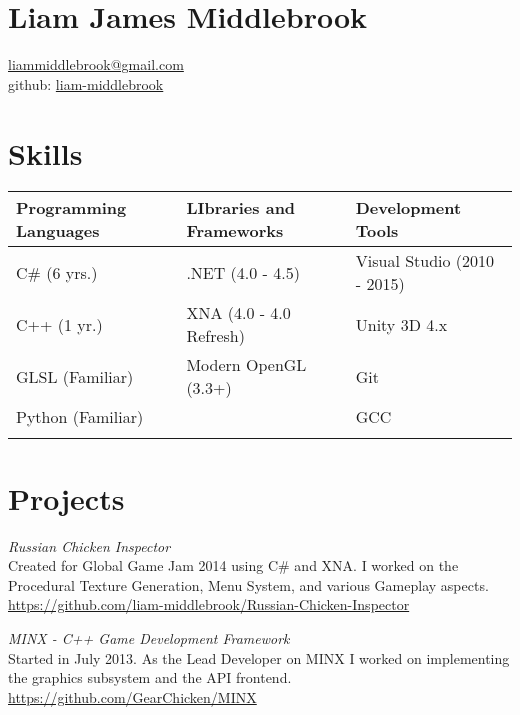 \documentclass[line,margin]{res}
\begin{document}
\marginsize{.25in}{.25in}{.25in}{.25in}

\section{Liam James Middlebrook}

\href{mailto:liammiddlebrook@gmail.com}{liammiddlebrook@gmail.com}\\
github: \href{https://github.com/liam-middlebrook}{liam-middlebrook}

\begin{resume}
\section{Skills}
\begin{table}[h]
\begin{tabular}{@{}lll@{}}
\toprule
Programming Languages & LIbraries and Frameworks & Development Tools           \\ \midrule
C\# (6 yrs.)          & .NET (4.0 - 4.5)         & Visual Studio (2010 - 2015) \\
C++ (1 yr.)           & XNA (4.0 - 4.0 Refresh)  & Unity 3D 4.x                \\
GLSL (Familiar)       & Modern OpenGL (3.3+)     & Git                         \\
Python (Familiar)     &                          & GCC                         \\
                      &                          &                             \\ \bottomrule
\end{tabular}
\end{table}
\section{Projects}
{\sl Russian Chicken
Inspector}\\
Created for Global Game Jam 2014 using C\# and XNA. I worked on the Procedural
Texture Generation, Menu System, and various Gameplay aspects.\\
\url{https://github.com/liam-middlebrook/Russian-Chicken-Inspector}



{\sl MINX - C++ Game Development
Framework}\\
Started in July 2013. As the Lead Developer on MINX I worked on implementing
the graphics subsystem and the API frontend.\\
\url{https://github.com/GearChicken/MINX}

\end{resume}
\end{document}
